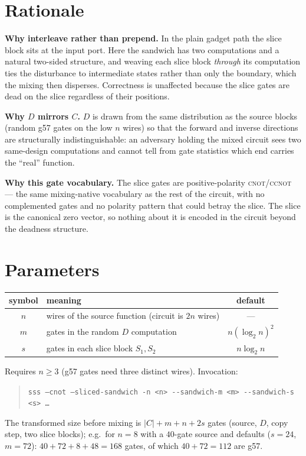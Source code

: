 \documentclass[11pt]{article}
\newcommand{\CNOT}{\textsc{cnot}}
\newcommand{\CCNOT}{\textsc{ccnot}}
\newcommand{\code}[1]{\texttt{#1}}
\begin{document}
\section{Rationale}

\textbf{Why interleave rather than prepend.} In the plain gadget path the
slice block sits at the input port. Here the sandwich has two computations and
a natural two-sided structure, and weaving each slice block \emph{through} its
computation ties the disturbance to intermediate states rather than only the
boundary, which the mixing then disperses. Correctness is unaffected because
the slice gates are dead on the slice regardless of their positions.

\textbf{Why $D$ mirrors $C$.} $D$ is drawn from the same distribution as the
source blocks (random g57 gates on the low $n$ wires) so that the forward and
inverse directions are structurally indistinguishable: an adversary holding
the mixed circuit sees two same-design computations and cannot tell from gate
statistics which end carries the ``real'' function.

\textbf{Why this gate vocabulary.} The slice gates are positive-polarity
\CNOT/\CCNOT{} --- the same mixing-native vocabulary as the rest of the
circuit, with no complemented gates and no polarity pattern that could betray
the slice. The slice is the canonical zero vector, so nothing about it is
encoded in the circuit beyond the deadness structure.

\section{Parameters}

\begin{center}
\renewcommand{\arraystretch}{1.2}
\begin{tabular}{clc}
\toprule
symbol & meaning & default \\
\midrule
$n$ & wires of the source function (circuit is $2n$ wires) & --- \\
$m$ & gates in the random $D$ computation & $n(\log_2 n)^2$ \\
$s$ & gates in each slice block $S_1, S_2$ & $n\log_2 n$ \\
\bottomrule
\end{tabular}
\end{center}

\noindent Requires $n \ge 3$ (g57 gates need three distinct wires). Invocation:
\begin{quote}
\code{sss --cnot --sliced-sandwich -n <n> {-}{-}sandwich-m <m> {-}{-}sandwich-s <s> \dots}
\end{quote}
The transformed size before mixing is
$\lvert C\rvert + m + n + 2s$ gates
(source, $D$, copy step, two slice blocks); e.g.\ for $n=8$ with a $40$-gate
source and defaults ($s=24$, $m=72$): $40+72+8+48 = 168$ gates, of which
$40+72=112$ are g57.
\end{document}
